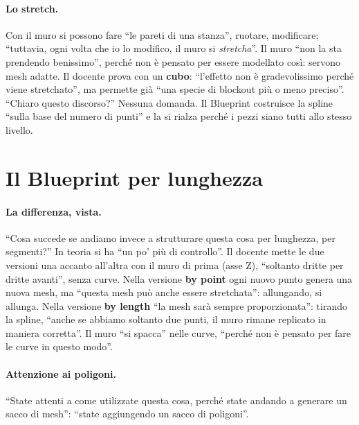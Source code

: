 \paragraph{Lo stretch.} Con il muro si possono fare ``le pareti di una stanza'', ruotare,
modificare; ``tuttavia, ogni volta che io lo modifico, il muro si \emph{stretcha}''. Il muro
``non la sta prendendo benissimo'', perché non è pensato per essere modellato così: servono
mesh adatte. Il docente prova con un \textbf{cubo}: ``l'effetto non è gradevolissimo perché viene
stretchato'', ma permette già ``una specie di blockout più o meno preciso''. ``Chiaro questo
discorso?'' Nessuna domanda. Il Blueprint costruisce la spline ``sulla base del numero di punti''
e la si rialza perché i pezzi siano tutti allo stesso livello.

\section{Il Blueprint per lunghezza}
\label{ue16:sec:bylength}

\paragraph{La differenza, vista.} ``Cosa succede se andiamo invece a strutturare questa cosa
per lunghezza, per segmenti?'' In teoria si ha ``un po' più di controllo''. Il docente mette le
due versioni una accanto all'altra con il muro di prima (asse Z), ``soltanto dritte per dritte
avanti'', senza curve. Nella versione \textbf{by point} ogni nuovo punto genera una nuova mesh,
ma ``questa mesh può anche essere stretchata'': allungando, si allunga. Nella versione
\textbf{by length} ``la mesh sarà sempre proporzionata'': tirando la spline, ``anche se abbiamo
soltanto due punti, il muro rimane replicato in maniera corretta''. Il muro ``si spacca'' nelle
curve, ``perché non è pensato per fare le curve in questo modo''.

\paragraph{Attenzione ai poligoni.} ``State attenti a come utilizzate questa cosa, perché state
andando a generare un sacco di mesh'': ``state aggiungendo un sacco di poligoni''.

